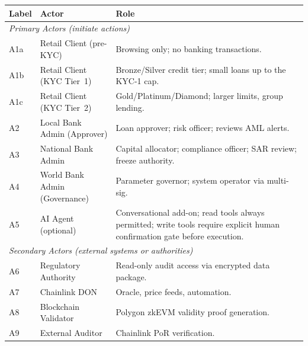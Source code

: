 \documentclass[12pt, a4paper]{report}
\newcommand{\tableheadcolor}{\rowcolor{TableHeadBg}}
\begin{document}
\begin{table}[H]
\centering
\begin{tabular}{p{1.2cm}p{4.2cm}p{7.9cm}}
\toprule
\tableheadcolor
\textbf{Label} & \textbf{Actor} & \textbf{Role} \\
\midrule
\multicolumn{3}{l}{\textit{Primary Actors (initiate actions)}} \\
A1a & Retail Client (pre-KYC) & Browsing only; no banking transactions. \\
A1b & Retail Client (KYC Tier~1) & Bronze/Silver credit tier; small loans up to the KYC-1 cap. \\
A1c & Retail Client (KYC Tier~2) & Gold/Platinum/Diamond; larger limits, group lending. \\
A2 & Local Bank Admin (Approver) & Loan approver; risk officer; reviews AML alerts. \\
A3 & National Bank Admin & Capital allocator; compliance officer; SAR review; freeze authority. \\
A4 & World Bank Admin (Governance) & Parameter governor; system operator via multi-sig. \\
A5 & AI Agent (optional) & Conversational add-on; read tools always permitted; write tools require explicit human confirmation gate before execution. \\
\multicolumn{3}{l}{\textit{Secondary Actors (external systems or authorities)}} \\
A6 & Regulatory Authority & Read-only audit access via encrypted data package. \\
A7 & Chainlink DON & Oracle, price feeds, automation. \\
A8 & Blockchain Validator & Polygon zkEVM validity proof generation. \\
A9 & External Auditor & Chainlink PoR verification. \\
\bottomrule
\end{tabular}
\end{table}
\end{document}
